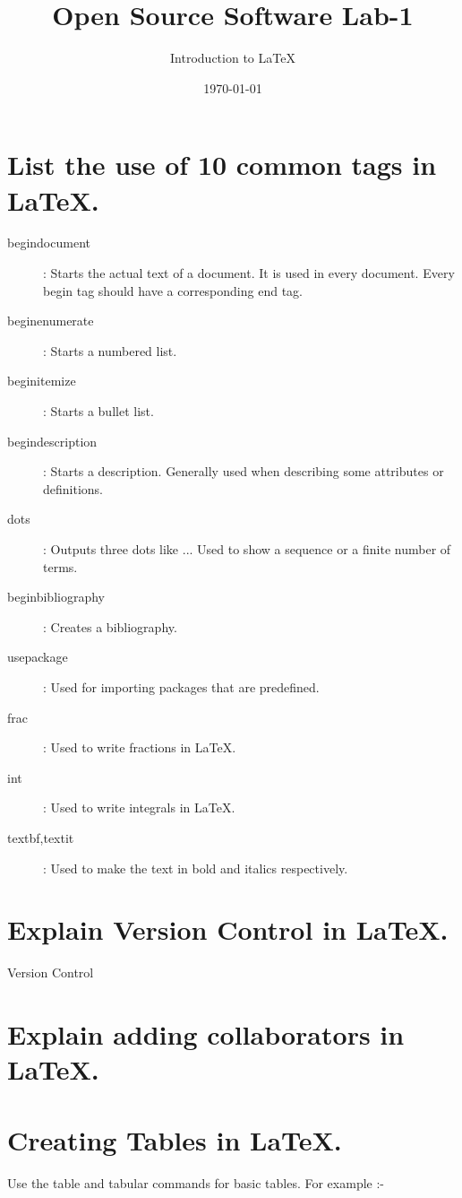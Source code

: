 \documentclass[a4paper]{article}
\title{Open Source Software Lab-1}
\author{Introduction to LaTeX}
\date{\today}
\begin{document}
\maketitle

\section{List the use of 10 common tags in LaTeX.}
\label{sec:introduction}

\begin{description}
\item[begin{document}]: Starts the actual text of a document. It is used in every document. Every begin tag should have a corresponding end tag.
\item[begin{enumerate}]: Starts a numbered list.
\item[begin{itemize}]: Starts a bullet list. 
\item[begin{description}]: Starts a description. Generally used when describing some attributes or definitions.
\item[dots]: Outputs three dots like ... Used to show a sequence or a finite number of terms.
\item[begin{bibliography}]: Creates a bibliography.
\item[usepackage]: Used for importing packages that are predefined.
\item[frac]: Used to write fractions in LaTeX.
\item[int]: Used to write integrals in LaTeX.
\item[textbf,textit]: Used to make the text in bold and italics respectively.
\end{description}

\section{Explain Version Control in LaTeX.}
\label{sec:theory}
Version Control


\section{Explain adding collaborators in LaTeX.}

\section{Creating Tables in LaTeX.}

Use the table and tabular commands for basic tables. For example :-
\end{document}
